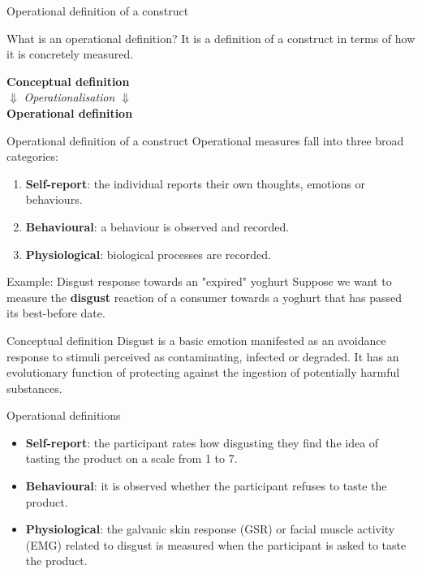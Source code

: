 \documentclass{beamer}
\begin{document}
\begin{frame}{Operational definition of a construct}
  \begin{block}{What is an operational definition?}
    It is a definition of a construct in terms of how it is concretely measured.
  \end{block}
  \pause
\vspace{0.8cm}
  \begin{center}
      \textbf{Conceptual definition} \\
      \bigskip
      $\Downarrow$ \quad \textit{\small Operationalisation} \quad $\Downarrow$ \\
      \bigskip
      \textbf{Operational definition} \\
  \end{center}
\end{frame}


\begin{frame}{Operational definition of a construct}
  Operational measures fall into three broad categories:
  \begin{enumerate}
      \item \textbf{Self-report}: the individual reports their own thoughts, emotions or behaviours.
      \item \textbf{Behavioural}: a behaviour is observed and recorded.
      \item \textbf{Physiological}: biological processes are recorded.
    \end{enumerate}
\end{frame}

\begin{frame}{Example: Disgust response towards an "expired" yoghurt}
\small
  Suppose we want to measure the \textbf{disgust} reaction of a consumer towards a yoghurt that has passed its best-before date.
  \pause
      \begin{block}{Conceptual definition}
    Disgust is a basic emotion manifested as an avoidance response to stimuli perceived as contaminating, infected or degraded. It has an evolutionary function of protecting against the ingestion of potentially harmful substances.
  \end{block}
  \pause
    \begin{block}{Operational definitions}
  \begin{itemize}
    \item \textbf{Self-report}: the participant rates how disgusting they find the idea of tasting the product on a scale from 1 to 7.
    \item \textbf{Behavioural}: it is observed whether the participant refuses to taste the product.
    \item \textbf{Physiological}: the galvanic skin response (GSR) or facial muscle activity (EMG) related to disgust is measured when the participant is asked to taste the product.
  \end{itemize}
\end{block}
\end{frame}
\end{document}
